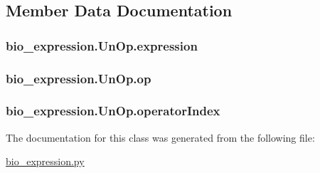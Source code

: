 \subsection{Member Data Documentation}
\hypertarget{classbio__expression_1_1_un_op_a33f0fb23ad12aea397027bc0276081dc}{
\subsubsection[{expression}]{\setlength{\rightskip}{0pt plus 5cm}bio\+\_\+expression.\+Un\+Op.\+expression}}\label{classbio__expression_1_1_un_op_a33f0fb23ad12aea397027bc0276081dc}
\hypertarget{classbio__expression_1_1_un_op_a2790ba638c53bee9402c6ed762f0b919}{
\subsubsection[{op}]{\setlength{\rightskip}{0pt plus 5cm}bio\+\_\+expression.\+Un\+Op.\+op}}\label{classbio__expression_1_1_un_op_a2790ba638c53bee9402c6ed762f0b919}
\hypertarget{classbio__expression_1_1_un_op_aa7c4a48c299e7b44e49d3f7a68fa40ec}{
\subsubsection[{operator\+Index}]{\setlength{\rightskip}{0pt plus 5cm}bio\+\_\+expression.\+Un\+Op.\+operator\+Index}}\label{classbio__expression_1_1_un_op_aa7c4a48c299e7b44e49d3f7a68fa40ec}


The documentation for this class was generated from the following file\+:\begin{DoxyCompactItemize}
\item 
\hyperlink{bio__expression_8py}{bio\+\_\+expression.\+py}\end{DoxyCompactItemize}
